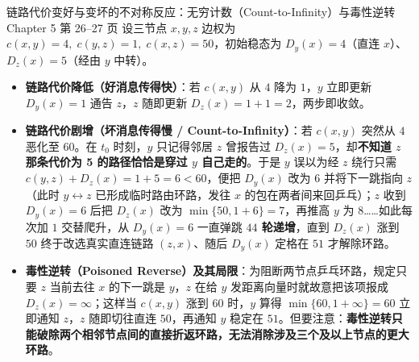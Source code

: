 \begin{StudyBlock}{链路代价变好与变坏的不对称反应：无穷计数（Count-to-Infinity）与毒性逆转}{Chapter 5 第 26–27 页}
设三节点 $x, y, z$ 边权为 $c(x, y) = 4,\; c(y, z) = 1,\; c(x, z) = 50$，初始稳态为 $D_y(x) = 4$（直连 $x$）、$D_z(x) = 5$（经由 $y$ 中转）。
\begin{itemize}
\item \textbf{链路代价降低（好消息传得快）}：若 $c(x, y)$ 从 $4$ 降为 $1$，$y$ 立即更新 $D_y(x) = 1$ 通告 $z$，$z$ 随即更新 $D_z(x) = 1 + 1 = 2$，两步即收敛。
\item \textbf{链路代价剧增（坏消息传得慢 / Count-to-Infinity）}：若 $c(x, y)$ 突然从 $4$ 恶化至 $60$。在 $t_0$ 时刻，$y$ 只记得邻居 $z$ 曾报告过 $D_z(x) = 5$，却\textbf{不知道 $z$ 那条代价为 5 的路径恰恰是穿过 $y$ 自己走的}。于是 $y$ 误以为经 $z$ 绕行只需 $c(y,z) + D_z(x) = 1 + 5 = 6 < 60$，便把 $D_y(x)$ 改为 $6$ 并将下一跳指向 $z$（此时 $y \leftrightarrow z$ 已形成临时路由环路，发往 $x$ 的包在两者间来回乒乓）；$z$ 收到 $D_y(x)=6$ 后把 $D_z(x)$ 改为 $\min\{50, 1+6\} = 7$，再推高 $y$ 为 $8$……如此每次加 $1$ 交替爬升，从 $D_y(x)=6$ 一直弹跳 \textbf{$44$ 轮递增}，直到 $D_z(x)$ 涨到 $50$ 终于改选真实直连链路 $(z, x)$、随后 $D_y(x)$ 定格在 $51$ 才解除环路。
\item \textbf{毒性逆转（Poisoned Reverse）及其局限}：为阻断两节点乒乓环路，规定只要 $z$ 当前去往 $x$ 的下一跳是 $y$，$z$ 在给 $y$ 发距离向量时就故意把该项报成 $D_z(x) = \infty$；这样当 $c(x, y)$ 涨到 $60$ 时，$y$ 算得 $\min\{60, 1+\infty\} = 60$ 立即通知 $z$，$z$ 随即切往直连 $50$，再通知 $y$ 稳定在 $51$。但要注意：\textbf{毒性逆转只能破除两个相邻节点间的直接折返环路，无法消除涉及三个及以上节点的更大环路}。
\end{itemize}
\end{StudyBlock}


